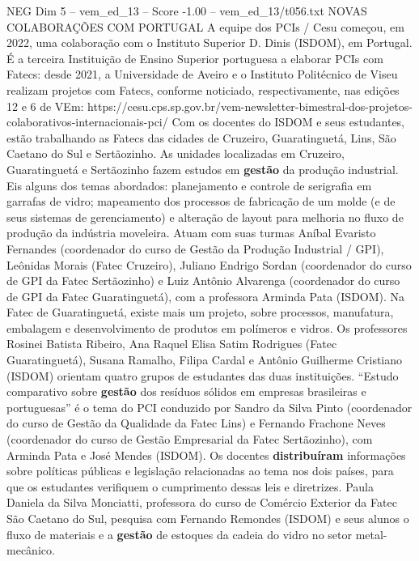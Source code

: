 \begin{textsample}{NEG Dim 5 – vem\_ed\_13 – Score -1.00 – vem\_ed\_13/t056.txt}  \label{ex:f5_neg_008}
NOVAS COLABORAÇÕES COM PORTUGAL A equipe dos PCIs / Cesu começou, em 2022, uma colaboração com o Instituto Superior D.
Dinis (ISDOM), em Portugal.
É a terceira Instituição de Ensino Superior portuguesa a elaborar PCIs com Fatecs: desde 2021, a Universidade de Aveiro e o Instituto Politécnico de Viseu realizam projetos com Fatecs, conforme noticiado, respectivamente, nas edições 12 e 6 de VEm: https://cesu.cps.sp.gov.br/vem-newsletter-bimestral-dos-projetos-colaborativos-internacionais-pci/ Com os docentes do ISDOM e seus estudantes, estão trabalhando as Fatecs das cidades de Cruzeiro, Guaratinguetá, Lins, São Caetano do Sul e Sertãozinho.
As unidades localizadas em Cruzeiro, Guaratinguetá e Sertãozinho fazem estudos em \textbf{gestão} da produção industrial.
Eis alguns dos temas abordados: planejamento e controle de serigrafia em garrafas de vidro; mapeamento dos processos de fabricação de um molde (e de seus sistemas de gerenciamento) e alteração de layout para melhoria no fluxo de produção da indústria moveleira.
Atuam com suas turmas Aníbal Evaristo Fernandes (coordenador do curso de Gestão da Produção Industrial / GPI), Leônidas Morais (Fatec Cruzeiro), Juliano Endrigo Sordan (coordenador do curso de GPI da Fatec Sertãozinho) e Luiz Antônio Alvarenga (coordenador do curso de GPI da Fatec Guaratinguetá), com a professora Arminda Pata (ISDOM).
Na Fatec de Guaratinguetá, existe mais um projeto, sobre processos, manufatura, embalagem e desenvolvimento de produtos em polímeros e vidros.
Os professores Rosinei Batista Ribeiro, Ana Raquel Elisa Satim Rodrigues (Fatec Guaratinguetá), Susana Ramalho, Filipa Cardal e Antônio Guilherme Cristiano (ISDOM) orientam quatro grupos de estudantes das duas instituições. “Estudo comparativo sobre \textbf{gestão} dos resíduos sólidos em empresas brasileiras e portuguesas” é o tema do PCI conduzido por Sandro da Silva Pinto (coordenador do curso de Gestão da Qualidade da Fatec Lins) e Fernando Frachone Neves (coordenador do curso de Gestão Empresarial da Fatec Sertãozinho), com Arminda Pata e José Mendes (ISDOM).
Os docentes \textbf{distribuíram} informações sobre políticas públicas e legislação relacionadas ao tema nos dois países, para que os estudantes verifiquem o cumprimento dessas leis e diretrizes.
Paula Daniela da Silva Monciatti, professora do curso de Comércio Exterior da Fatec São Caetano do Sul, pesquisa com Fernando Remondes (ISDOM) e seus alunos o fluxo de materiais e a \textbf{gestão} de estoques da cadeia do vidro no setor metal-mecânico.

\end{textsample}
